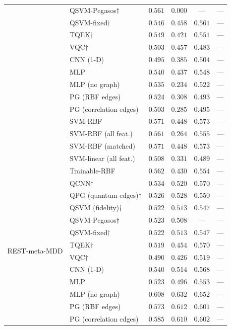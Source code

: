 \begin{table}[t]
\begin{tabular}{|l|l|c|c|c|c|}
  & QSVM-Pegasos$\dagger$ & $0.561$ & $0.000$ & --- & --- \\
  & QSVM-fixed$\dagger$ & $0.546$ & $0.458$ & $0.561$ & --- \\
  & TQEK$\dagger$ & $0.549$ & $0.421$ & $0.551$ & --- \\
  & VQC$\dagger$ & $0.503$ & $0.457$ & $0.483$ & --- \\
  & CNN (1-D) & $0.495$ & $0.385$ & $0.504$ & --- \\
  & MLP & $0.540$ & $0.437$ & $0.548$ & --- \\
  & MLP (no graph) & $0.535$ & $0.234$ & $0.522$ & --- \\
  & PG (RBF edges) & $0.524$ & $0.308$ & $0.493$ & --- \\
  & PG (correlation edges) & $0.503$ & $0.285$ & $0.495$ & --- \\
  & SVM-RBF & $0.571$ & $0.448$ & $0.573$ & --- \\
  & SVM-RBF (all feat.) & $0.561$ & $0.264$ & $0.555$ & --- \\
  & SVM-RBF (matched) & $0.571$ & $0.448$ & $0.573$ & --- \\
  & SVM-linear (all feat.) & $0.508$ & $0.331$ & $0.489$ & --- \\
  & Trainable-RBF & $0.562$ & $0.430$ & $0.554$ & --- \\
\hline
 \multirow{17}{*}{REST-meta-MDD} & QCNN$\dagger$ & $0.534$ & $0.520$ & $0.570$ & --- \\
  & QPG (quantum edges)$\dagger$ & $0.526$ & $0.528$ & $0.550$ & --- \\
  & QSVM (fidelity)$\dagger$ & $0.522$ & $0.513$ & $0.547$ & --- \\
  & QSVM-Pegasos$\dagger$ & $0.523$ & $0.508$ & --- & --- \\
  & QSVM-fixed$\dagger$ & $0.522$ & $0.513$ & $0.547$ & --- \\
  & TQEK$\dagger$ & $0.519$ & $0.454$ & $0.570$ & --- \\
  & VQC$\dagger$ & $0.490$ & $0.426$ & $0.519$ & --- \\
  & CNN (1-D) & $0.540$ & $0.514$ & $0.568$ & --- \\
  & MLP & $0.523$ & $0.496$ & $0.553$ & --- \\
  & MLP (no graph) & $0.608$ & $0.632$ & $0.652$ & --- \\
  & PG (RBF edges) & $0.573$ & $0.612$ & $0.601$ & --- \\
  & PG (correlation edges) & $0.585$ & $0.610$ & $0.602$ & --- \\

\end{tabular}
\end{table}

